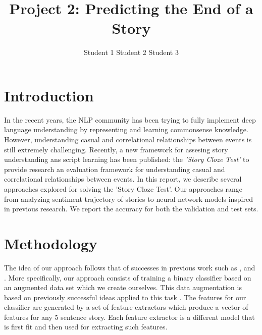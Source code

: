 \documentclass{article}
\title{Project 2: Predicting the End of a Story}
\author{Student 1 \qquad Student 2 \qquad Student 3}
\begin{document}

\maketitle



\section{Introduction}
\label{sec:intro}

In the recent years, the NLP community has been trying to fully implement deep
language understanding by representing and learning commonsense knowledge.
However, understanding casual and correlational relationships between events is
still extremely challenging. Recently, a new framework for assesing story
understanding ans script learning has been published: the {\it 'Story Cloze
    Test'} to provide research an evaluation framework for understanding casual
and correlational relationships between events. In this report, we describe
several approaches explored for solving the 'Story Cloze Test'. Our approaches
range from analyzing sentiment trajectory of stories to neural network models
inspired in previous research. We report the accuracy for both the validation
and test sets.


\section{Methodology}
\label{sec:general}

The idea of our approach follows that of successes in previous work such as
\cite{UWNLP}, \cite{Goel} and \cite{COGCOMP}. More specifically, our approach
consists of training a binary classifier based on an augmented data set which we
create ourselves. This data augmentation is based on previously successful ideas
applied to this task \cite{LSTMClassifier, SENTENCE_EMB}.  The features for our
classifier are generated by a set of feature extractors which produce a vector
of features for any 5 sentence story. Each feature extractor is a different
model that is first fit and then used for extracting such features.
\end{document}
